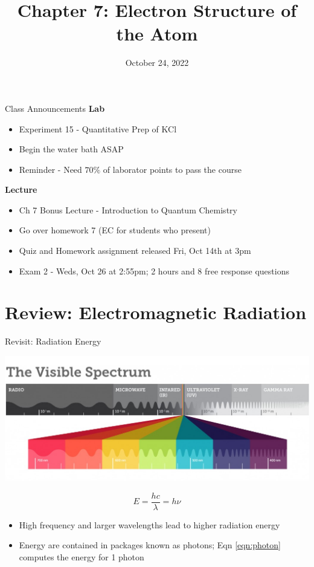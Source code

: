 \documentclass[11pt]{beamer}
\title{Chapter 7: Electron Structure of the Atom}
\institute{Chemistry Department, Cypress College}
\date{October 24, 2022}
\begin{document}
\begin{frame}
  \titlepage
\end{frame}

\begin{frame}{Class Announcements}
  \textbf{Lab}
  \begin{itemize}
  \item Experiment 15 - Quantitative Prep of KCl
  \item Begin the water bath ASAP
  \item Reminder - Need $70\%$ of laborator points to pass
    the course
  \end{itemize}

  \textbf{Lecture}
  \begin{itemize}
  \item Ch 7 Bonus Lecture - Introduction to Quantum Chemistry
  \item Go over homework 7 (EC for students who present)
  \item Quiz and Homework assignment released Fri, Oct 14th at 3pm
  \item Exam 2 - Weds, Oct 26 at 2:55pm; 2 hours and 8 free response
    questions
  \end{itemize}
\end{frame}

\section{Review: Electromagnetic Radiation}

\begin{frame}{Revisit: Radiation Energy}
  \begin{center}
    \includegraphics[width=0.85\linewidth]{visible_light}
  \end{center}
  \begin{equation}
    E = \frac{hc}{\lambda} = h\nu
    \label{eqn:photon}
  \end{equation}
  \begin{itemize}
  \item High frequency and larger wavelengths lead to higher radiation
    energy
  \item Energy are contained in packages known as photons; Eqn \ref{eqn:photon}
    computes the energy for 1 photon
  \end{itemize}
\end{frame}
\end{document}

